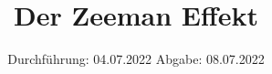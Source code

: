 

\subject{V27}
\title{Der Zeeman Effekt}
\date{%
  Durchführung: 04.07.2022
  \hspace{3em}
  Abgabe: 08.07.2022
}



\maketitle
\thispagestyle{empty}
\tableofcontents
\newpage





\nocite{*}
\printbibliography{}


